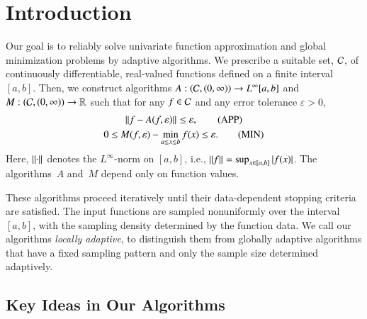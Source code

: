 \documentclass[review]{elsarticle}
\newcommand{\abstol}{\varepsilon}
\theoremstyle{definition}
\begin{document}
\section{Introduction} \label{sec:intro}

Our goal is to reliably solve univariate function approximation and global minimization
problems by adaptive algorithms. We prescribe a suitable set, $\mathcal{C}$, of continuously
differentiable, real-valued functions defined on a finite interval $[a,b]$.  Then, we
construct algorithms $A:(\mathcal{C},(0,\infty)) \to L^{\infty}[a,b]$ and $M:
(\mathcal{C},(0,\infty)) \to \mathbb{R}$ such that for any $f \in \mathcal{C}$ and any error
tolerance $\abstol > 0$,
\begin{gather} \norm{f - A(f,\abstol)} \le \abstol,
\tag{APP} \label{appxprob} \\
0 \le M(f,\abstol) - \min_{a \le x \le b} f(x) \le
\abstol. \tag{MIN} \label{optprob}
\end{gather}
Here, $\left \lVert \cdot \right \rVert_{{}}$ denotes the
$L^{\infty}$-norm on $[a,b]$, i.e., $\left \lVert f \right \rVert_{{}} =\sup_{x\in[a,b]} |f(x)|$. The algorithms~$A$ and~$M$ depend only on function
values.

These algorithms proceed iteratively until their data-dependent stopping
criteria are satisfied. The input functions are sampled nonuniformly over
the interval $[a,b]$, with the sampling density determined by the function data.
We call our algorithms \emph{locally adaptive}, to distinguish them from
globally adaptive algorithms that have a fixed sampling pattern and only the
sample size determined adaptively.

\subsection{Key Ideas in Our Algorithms} \label{subsec:keyideas}
\end{document}
